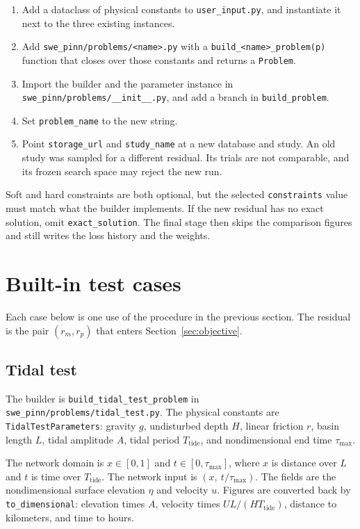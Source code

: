 \documentclass[11pt]{article}
\begin{document}
\begin{enumerate}[leftmargin=1.4em]
\item Add a dataclass of physical constants to \texttt{user\_input.py}, and instantiate it next to the three existing instances.
\item Add \texttt{swe\_pinn/problems/<name>.py} with a \texttt{build\_<name>\_problem(p)} function that closes over those constants and returns a \texttt{Problem}.
\item Import the builder and the parameter instance in \texttt{swe\_pinn/problems/\_\_init\_\_.py}, and add a branch in \texttt{build\_problem}.
\item Set \texttt{problem\_name} to the new string.
\item Point \texttt{storage\_url} and \texttt{study\_name} at a new database and study.
  An old study was sampled for a different residual.
  Its trials are not comparable, and its frozen search space may reject the new run.
\end{enumerate}

Soft and hard constraints are both optional, but the selected \texttt{constraints} value must match what the builder implements.
If the new residual has no exact solution, omit \texttt{exact\_solution}.
The final stage then skips the comparison figures and still writes the loss history and the weights.

\section{Built-in test cases}

Each case below is one use of the procedure in the previous section.
The residual is the pair \((r_{m}, r_{p})\) that enters Section~\ref{sec:objective}.

\subsection{Tidal test}

The builder is \texttt{build\_tidal\_test\_problem} in \texttt{swe\_pinn/problems/tidal\_test.py}.
The physical constants are \texttt{TidalTestParameters}: gravity \(g\), undisturbed depth \(H\), linear friction \(r\), basin length \(L\), tidal amplitude \(A\), tidal period \(T_{\mathrm{tide}}\), and nondimensional end time \(\tau_{\max}\).

The network domain is \(x\in[0,1]\) and \(t\in[0,\tau_{\max}]\), where \(x\) is distance over \(L\) and \(t\) is time over \(T_{\mathrm{tide}}\).
The network input is \((x,\ t/\tau_{\max})\).
The fields are the nondimensional surface elevation \(\eta\) and velocity \(u\).
Figures are converted back by \texttt{to\_dimensional}: elevation times \(A\), velocity times \(UL/(HT_{\mathrm{tide}})\), distance to kilometers, and time to hours.
\end{document}
